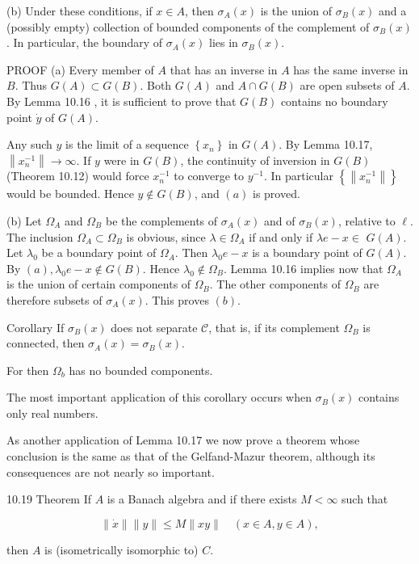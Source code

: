 \documentclass[10pt]{article}
\begin{document}
(b) Under these conditions, if $x \in A$, then $\sigma_{A}(x)$ is the union of $\sigma_{B}(x)$ and a (possibly empty) collection of bounded components of the complement of $\sigma_{B}(x)$. In particular, the boundary of $\sigma_{A}(x)$ lies in $\sigma_{B}(x)$.

PROOF (a) Every member of $A$ that has an inverse in $A$ has the same inverse in $B$. Thus $G(A) \subset G(B)$. Both $G(A)$ and $A \cap G(B)$ are open subsets of $A$. By Lemma 10.16 , it is sufficient to prove that $G(B)$ contains no boundary point $\dot{y}$ of $G(A)$.

Any such $y$ is the limit of a sequence $\left\{x_{n}\right\}$ in $G(A)$. By Lemma 10.17, $\left\|x_{n}^{-1}\right\| \rightarrow \infty$. If $y$ were in $G(B)$, the continuity of inversion in $G(B)$ (Theorem 10.12) would force $x_{n}^{-1}$ to converge to $y^{-1}$. In particular $\left\{\left\|x_{n}^{-1}\right\|\right\}$ would be bounded. Hence $y \notin G(B)$, and $(a)$ is proved.

(b) Let $\Omega_{A}$ and $\Omega_{B}$ be the complements of $\sigma_{A}(x)$ and of $\sigma_{B}(x)$, relative to $\ell$. The inclusion $\Omega_{A} \subset \Omega_{B}$ is obvious, since $\lambda \in \Omega_{A}$ if and only if $\lambda e-x \in$ $G(A)$. Let $\lambda_{0}$ be a boundary point of $\Omega_{A}$. Then $\lambda_{0} e-x$ is a boundary point of $G(A)$. By $(a), \lambda_{0} e-x \notin G(B)$. Hence $\lambda_{0} \notin \Omega_{B}$. Lemma 10.16 implies now that $\Omega_{A}$ is the union of certain components of $\Omega_{B}$. The other components of $\Omega_{B}$ are therefore subsets of $\sigma_{A}(x)$. This proves $(b)$.

Corollary If $\sigma_{B}(x)$ does not separate $\mathcal{C}$, that is, if its complement $\Omega_{B}$ is connected, then $\sigma_{A}(x)=\sigma_{B}(x)$.

For then $\Omega_{b}$ has no bounded components.

The most important application of this corollary occurs when $\sigma_{B}(x)$ contains only real numbers.

As another application of Lemma 10.17 we now prove a theorem whose conclusion is the same as that of the Gelfand-Mazur theorem, although its consequences are not nearly so important.

10.19 Theorem If $A$ is a Banach algebra and if there exists $M<\infty$ such that

$$
\|\dot{x}\|\|y\| \leq M\|x y\| \quad(x \in A, y \in A),
$$

then $A$ is (isometrically isomorphic to) $C$.
\end{document}
